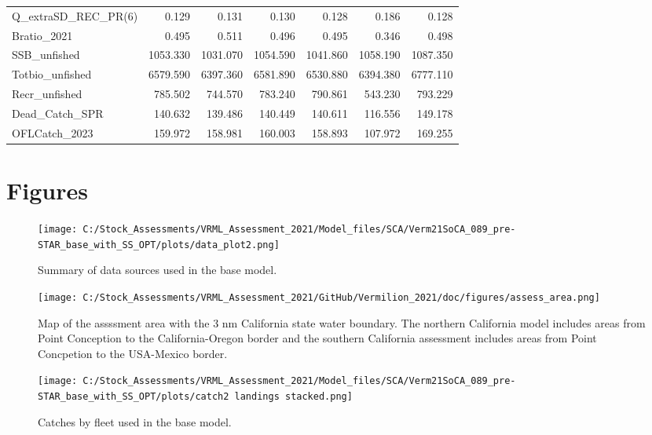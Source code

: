 \documentclass[
  english,
  a4paper,
]{article}
\begin{document}
\begin{table}
{\begin{tabular}[t]{lrrrrrr}
Q\_extraSD\_REC\_PR(6) & 0.129 & 0.131 & 0.130 & 0.128 & 0.186 & 0.128\\
Bratio\_2021 & 0.495 & 0.511 & 0.496 & 0.495 & 0.346 & 0.498\\
SSB\_unfished & 1053.330 & 1031.070 & 1054.590 & 1041.860 & 1058.190 & 1087.350\\
Totbio\_unfished & 6579.590 & 6397.360 & 6581.890 & 6530.880 & 6394.380 & 6777.110\\
Recr\_unfished & 785.502 & 744.570 & 783.240 & 790.861 & 543.230 & 793.229\\
Dead\_Catch\_SPR & 140.632 & 139.486 & 140.449 & 140.611 & 116.556 & 149.178\\
OFLCatch\_2023 & 159.972 & 158.981 & 160.003 & 158.893 & 107.972 & 169.255\\
\bottomrule
\end{tabular}}
\end{table}

\clearpage

\hypertarget{figures}{%
\section{Figures}\label{figures}}

\begin{figure}
\centering
\texttt{[image: C:/Stock\_Assessments/VRML\_Assessment\_2021/Model\_files/SCA/Verm21SoCA\_089\_pre-STAR\_base\_with\_SS\_OPT/plots/data\_plot2.png]}
\caption{Summary of data sources used in the base model.\label{fig:data-plot}}
\end{figure}

\begin{figure}
\centering
\texttt{[image: C:/Stock\_Assessments/VRML\_Assessment\_2021/GitHub/Vermilion\_2021/doc/figures/assess\_area.png]}
\caption{Map of the assssment area with the 3 nm California state water boundary. The northern California model includes areas from Point Conception to the California-Oregon border and the southern California assessment includes areas from Point Concpetion to the USA-Mexico border.\label{fig:assess-area}}
\end{figure}

\begin{figure}
\centering
\texttt{[image: C:/Stock\_Assessments/VRML\_Assessment\_2021/Model\_files/SCA/Verm21SoCA\_089\_pre-STAR\_base\_with\_SS\_OPT/plots/catch2 landings stacked.png]}
\caption{Catches by fleet used in the base model.\label{fig:catch}}
\end{figure}
\end{document}
